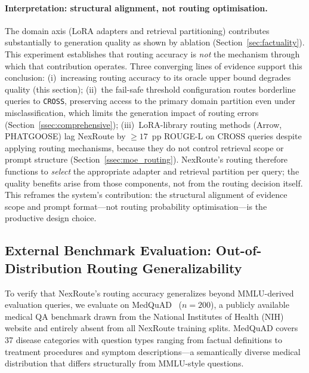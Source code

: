 \documentclass[a4paper,fleql,doubleblind]{cas-sc}
\begin{document}
\paragraph{Interpretation: structural alignment, not routing optimisation.}
The domain axis (LoRA adapters and retrieval partitioning) contributes
substantially to generation quality as shown by ablation (Section~\ref{sec:factuality}).
This experiment establishes that routing accuracy is \emph{not} the mechanism through
which that contribution operates.
Three converging lines of evidence support this conclusion:
(i)~increasing routing accuracy to its oracle upper bound degrades quality (this section);
(ii)~the fail-safe threshold configuration routes borderline queries to \texttt{CROSS},
preserving access to the primary domain partition even under misclassification,
which limits the generation impact of routing errors
(Section~\ref{ssec:comprehensive});
(iii)~LoRA-library routing methods (Arrow, PHATGOOSE) lag NexRoute by ${\geq}17$~pp
ROUGE-L on CROSS queries despite applying routing mechanisms, because they do not
control retrieval scope or prompt structure (Section~\ref{ssec:moe_routing}).
NexRoute's routing therefore functions to \emph{select} the appropriate adapter and
retrieval partition per query; the quality benefits arise from those components,
not from the routing decision itself.
This reframes the system's contribution: the structural alignment of evidence scope
and prompt format---not routing probability optimisation---is the productive design choice.

\subsection{External Benchmark Evaluation: Out-of-Distribution Routing Generalizability}
\label{ssec:external}
To verify that NexRoute's routing accuracy generalizes beyond MMLU-derived evaluation
queries, we evaluate on MedQuAD~\citep{ben2019question} ($n{=}200$), a publicly
available medical QA benchmark drawn from the National Institutes of Health (NIH)
website and entirely absent from all NexRoute training splits.
MedQuAD covers 37 disease categories with question types ranging from factual
definitions to treatment procedures and symptom descriptions---a semantically diverse
medical distribution that differs structurally from MMLU-style questions.
\end{document}

